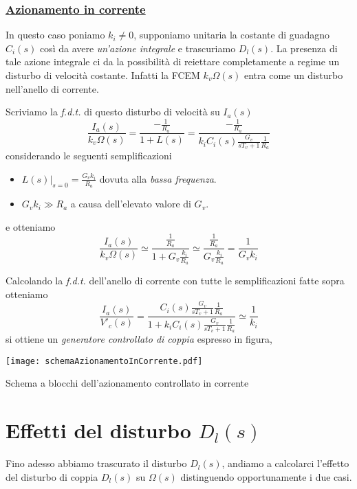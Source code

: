 \subsubsection{\underline{Azionamento in corrente}}
In questo caso poniamo $k_i \neq 0$, supponiamo unitaria la costante di guadagno $C_i(s)$ così da avere \emph{un'azione integrale} e trascuriamo $D_l(s)$. La presenza di tale azione integrale ci da la possibilità di reiettare completamente a regime un disturbo di velocità costante. Infatti la FCEM $k_v \Omega(s)$ entra come un disturbo nell'anello di corrente.

Scriviamo la \emph{f.d.t.} di questo disturbo di velocità su $I_a(s)$
\begin{equation}
	\frac{I_a(s)}{k_v \Omega(s)} = \frac{-\frac{1}{R_a}}{1 + L(s)} = \frac{-\frac{1}{R_a}}{k_i C_i(s) \frac{G_v}{sT_v + 1} \frac{1}{R_a}}
\end{equation}
considerando le seguenti semplificazioni
\begin{itemize}
	\item $L(s)\vert_{s = 0} = \frac{G_v k_i}{R_a}$ dovuta alla \emph{bassa frequenza}.
	\item $G_v k_i \gg R_a$ a causa dell'elevato valore di $G_v$.
\end{itemize}
e otteniamo
\begin{equation}
	\frac{I_a(s)}{k_v \Omega(s)} \simeq \frac{\frac{1}{R_a}}{1 + G_v \frac{k_i}{R_a}} \simeq \frac{\frac{1}{R_a}}{G_v \frac{k_i}{R_a}} = \frac{1}{G_v k_i}
\end{equation}

Calcolando la \emph{f.d.t.} dell'anello di corrente con tutte le semplificazioni fatte sopra otteniamo
\begin{equation}
	\frac{I_a(s)}{V'_c(s)} = \frac{C_i(s) \frac{G_v}{sT_v + 1} \frac{1}{R_a}}{1 + k_i C_i(s) \frac{G_v}{s T_v + 1} \frac{1}{R_a}} \simeq \frac{1}{k_i}
\end{equation}
si ottiene un \emph{generatore controllato di coppia} espresso in figura,
\begin{center}
	\texttt{[image: schemaAzionamentoInCorrente.pdf]}
	\caption{Schema a blocchi dell'azionamento controllato in corrente}
\end{center}

\section{Effetti del disturbo $D_l(s)$}
Fino adesso abbiamo trascurato il disturbo $D_l(s)$, andiamo a calcolarci l'effetto del disturbo di coppia $D_l(s)$ su $\Omega(s)$ distinguendo opportunamente i due casi.

